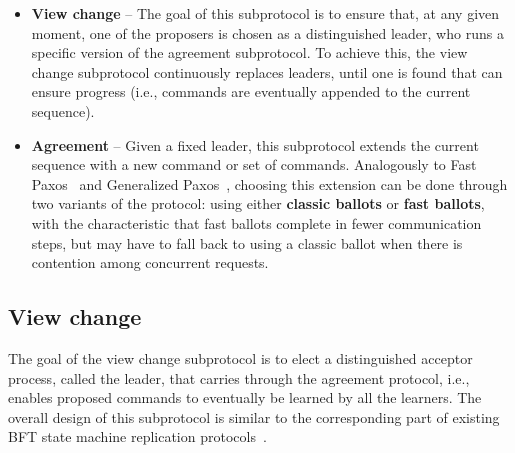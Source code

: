 \begin{itemize}

\item
  {\bf View change} -- The goal of this subprotocol is to ensure that, at any given moment, one of the proposers is chosen as a distinguished leader, who runs a specific version of the agreement subprotocol. To achieve this, the view change subprotocol continuously replaces leaders, until one is found that can ensure progress (i.e., commands are eventually appended to the current sequence).

\item
{\bf Agreement} -- Given a fixed leader, this subprotocol extends the current sequence with a new command or set of commands. Analogously to Fast Paxos~\cite{L06} and Generalized Paxos~\cite{Lamport2005}, choosing this extension can be done through two variants of the protocol: using either {\bf classic ballots} or {\bf fast ballots}, with the characteristic that fast ballots complete in fewer communication steps, but may have to fall back to using a classic ballot when there is contention among concurrent requests.

\end{itemize}

\subsection{View change} 

The goal of the view change subprotocol is to elect a distinguished acceptor process, called the leader, that carries through the agreement protocol, i.e., enables proposed commands to eventually be learned by all the learners. The overall design of this subprotocol is similar to the corresponding part of existing BFT state machine replication protocols~\cite{CL99}.\par

